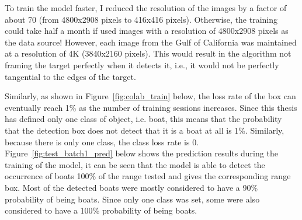 To train the model faster, I reduced the resolution of the images by a factor of about 70 (from 4800x2908 pixels to 416x416 pixels). Otherwise, the training could take half a month if used images with a resolution of 4800x2908 pixels as the data source! However, each image from the Gulf of California was maintained at a resolution of 4K (3840x2160 pixels). This would result in the algorithm not framing the target perfectly when it detects it, i.e., it would not be perfectly tangential to the edges of the target.

Similarly, as shown in Figure~\ref{fig:colab_train} below, the loss rate of the box can eventually reach 1\% as the number of training sessions increases. Since this thesis has defined only one class of object, i.e. boat, this means that the probability that the detection box does not detect that it is a boat at all is 1\%. Similarly, because there is only one class, the class loss rate is 0. Figure~\ref{fig:test_batch1_pred} below shows the prediction results during the training of the model, it can be seen that the model is able to detect the occurrence of boats 100\% of the range tested and gives the corresponding range box. Most of the detected boats were mostly considered to have a 90\% probability of being boats. Since only one class was set, some were also considered to have a 100\% probability of being boats.



